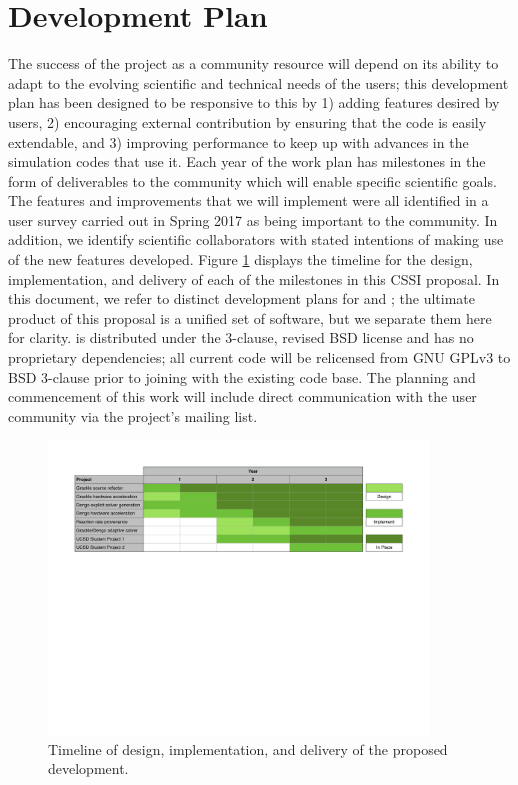 \section{Development Plan}

The success of the \grackle{} project as a community resource will depend on
its ability to adapt to the evolving scientific and technical needs of the
users; this development plan has been designed to be responsive to this by 1)
adding features desired by users, 2) encouraging external contribution by
ensuring that the code is easily extendable, and 3) improving performance to
keep up with advances in the simulation codes that use it.
Each year of the work plan has milestones in the form of
deliverables to the community which will enable specific scientific
goals. The features and improvements that we will implement were all
identified in a \grackle{} user survey carried out in Spring 2017 as
being important to the community. In addition, we identify scientific
collaborators with stated intentions of making use of the new features
developed.  Figure \ref{fig:gantt} displays the timeline for the
design, implementation, and delivery of each of the milestones in this
CSSI proposal. In this document, we refer to distinct development plans for
\grackle{} and \dengo{}; the ultimate product of this proposal is a unified set
of software, but we separate them here for clarity.
\grackle{} is distributed under the
3-clause, revised BSD license and has no proprietary
dependencies; all current \dengo{} code will be relicensed from GNU GPLv3 to
BSD 3-clause prior to joining with the existing \grackle{} code base. The
planning and commencement of this work will include direct communication with
the \grackle{} user community via the project's mailing list.

\begin{figure}
\begin{center}
\includegraphics[width=0.9\textwidth]{figures/gantt.pdf}
\caption{Timeline of design, implementation, and delivery of the
  proposed development.}
\label{fig:gantt}
\end{center}
\vspace*{-2\baselineskip}
\end{figure}

